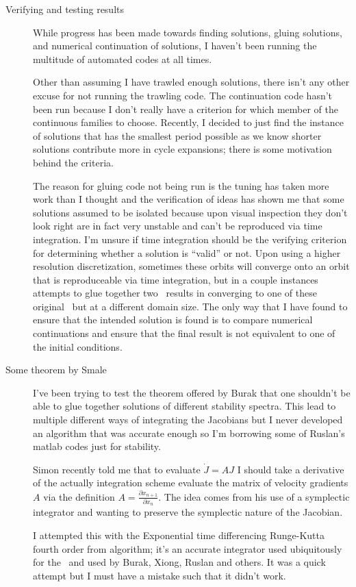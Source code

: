 \begin{description}
{\begin{description}
\item[Verifying and testing results]
While progress has been made towards finding solutions, gluing solutions, and numerical
continuation of solutions, I haven't been running the multitude of automated codes
at all times.

Other than assuming I have trawled enough solutions, there isn't any
other excuse for not running the trawling code. The continuation code hasn't been
run because I don't really have a criterion for which member of the continuous families
to choose. Recently, I decided to just find the instance of solutions that has the smallest
period possible as we know shorter solutions contribute more in cycle expansions; \ie there
is some motivation behind the criteria.

The reason for gluing code not being run is the tuning has taken more work than I thought
and the verification of ideas has shown me that some solutions assumed to be isolated because
upon visual inspection they don't look right are in fact very unstable and can't be reproduced
via time integration. I'm unsure if time integration should be the verifying criterion for determining
whether a solution is ``valid'' or not. Upon using a higher resolution discretization, sometimes
these orbits will converge onto an orbit that is reproduceable via time integration, but in a couple
instances attempts to glue together two \twots\ results in converging to one of these original \twots\ but
at a different domain size. The only way that I have found to ensure that the intended solution is found is
to compare numerical continuations and ensure that the final result is not equivalent to one of the initial conditions.

\item[Some theorem by Smale]
I've been trying to test the theorem offered by Burak that one shouldn't be able to glue together solutions
of different stability spectra. This lead to multiple different ways of integrating the Jacobians but I never
developed an algorithm that was accurate enough so I'm borrowing some of Ruslan's matlab codes just for stability.

Simon recently told me that to evaluate $\dot{J} = AJ$ I should take a derivative of the actually integration scheme
\ie evaluate the matrix of velocity gradients $A$ via the definition $A = \frac{\partial x_{n+1}}{\partial x_n}$. The idea
comes from his use of a symplectic integrator and wanting to preserve the symplectic nature of the Jacobian.

I attempted this with the Exponential time differencing Runge-Kutta fourth order from  algorithm; it's an
accurate integrator used ubiquitously for the \KSe\ and used by Burak, Xiong, Ruslan and others. It was a quick
attempt but I must have a mistake such that it didn't work.


\end{description}}
\end{description}
